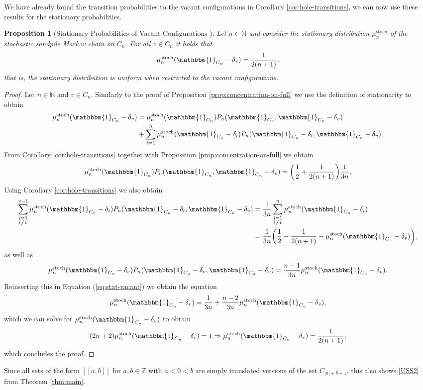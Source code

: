 \documentclass[11pt]{article}
\newtheorem{proposition}{Proposition}[section]
\newcommand{\N}{\mathbb{N}}
\newcommand{\Z}{\mathbb{Z}}
\newcommand{\stoch}{\text{stoch}}
\newcommand{\statn}[1]{\mu^{\stoch}_{#1}}
\newcommand{\one}{\mathbbm{1}}
\newcommand{\trans}[1]{P_{#1}}
\begin{document}
We have already found the transition probabilities to the vacant configurations in Corollary \ref{cor:hole-transitions}, we can now use these results for the stationary probabilities.
\begin{proposition}[Stationary Probabilities of Vacant Configurations ]\label{prop:vacant-stat}
    Let $n\in\N$ and consider the stationary distribution $\statn{n}$ of the stochastic sandpile Markov chain on $C_n$. For all $v\in C_n$ it holds that
    $$\statn{n}(\one_{C_n}-\delta_v)=\frac{1}{2(n+1)},$$
    that is, the stationary distribution is uniform when restricted to the vacant configurations.
\end{proposition}
\begin{proof}
    Let $n\in\N$ and $v\in C_n$. Similarly  to the proof of Proposition \ref{prop:concentration-on-full} we use the definition of stationarity to obtain
    \begin{equation}
    \label{eq:stat-vacant}
    \begin{aligned}
        \statn{n}(\one_{C_n}-\delta_v)&=\statn{n}(\one_{C_n})\trans{n}(\one_{C_n},\one_{C_n}-\delta_v)\\&+\sum_{i=1}^n\statn{n}(\one_{C_n}-\delta_i)\trans{n}(\one_{C_n}-\delta_i,\one_{C_n}-\delta_v).
    \end{aligned}
    \end{equation}
    From Corollary \ref{cor:hole-transitions} together with Proposition \ref{prop:concentration-on-full} we obtain
    $$\statn{n}(\one_{C_n})\trans{n}(\one_{C_n},\one_{C_n}-\delta_v)=\bigg(\frac{1}{2}+\frac{1}{2(n+1)}\bigg)\frac{1}{3n}.$$
    Using Corollary \ref{cor:hole-transitions} we also obtain
    \begin{align*}
    \sum_{\substack{i=1\\ i\neq v}}^{v-1}\statn{n}(\one_{C_n}-\delta_i)\trans{n}(\one_{C_n}-\delta_i,\one_{C_n}-\delta_v)&=\frac{1}{3n}\sum_{\substack{i=1\\ i\neq v}}^n\statn{n}(\one_{C_n}-\delta_i)\\&=\frac{1}{3n}\bigg(\frac{1}{2}-\frac{1}{2(n+1)}-\statn{n}(\one_{C_n}-\delta_v)\bigg),
    \end{align*}
    as well as
    $$\statn{n}(\one_{C_n}-\delta_v)\trans{n}(\one_{C_n}-\delta_v,\one_{C_n}-\delta_v)=\frac{n-1}{3n}\statn{n}(\one_{C_n}-\delta_v).$$
    Reinserting this in Equation (\ref{eq:stat-vacant}) we obtain the equation
    \begin{align*}
        \statn{n}(\one_{C_n}-\delta_v)=\frac{1}{3n}+\frac{n-2}{3n}\statn{n}(\one_{C_n}-\delta_v),
    \end{align*}
    which we can solve for $\statn{n}(\one_{C_n}-\delta_v)$ to obtain
    $$(2n+2)\statn{n}(\one_{C_n}-\delta_v)=1\Rightarrow\statn{n}(\one_{C_n}-\delta_v)=\frac{1}{2(n+1)},$$
    which concludes the proof.
\end{proof}
Since all sets of the form $[[a,b]]$ for $a,b\in\Z$ with $a<0<b$ are simply translated versions of the set $C_{|a|+b+1}$, this also shows \ref{USS2} from Theorem \ref{thm:main}.
\end{document}
